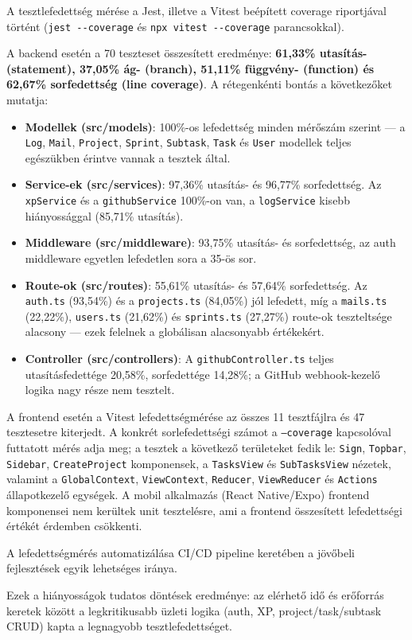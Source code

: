 A tesztlefedettség mérése a Jest, illetve a Vitest beépített coverage riportjával történt (\texttt{jest -{}-coverage} és \texttt{npx vitest -{}-coverage} parancsokkal).


A backend esetén a 70 teszteset összesített eredménye: \textbf{61,33\% utasítás- (statement), 37,05\% ág- (branch), 51,11\% függvény- (function) és 62,67\% sorfedettség (line coverage)}. A rétegenkénti bontás a következőket mutatja:

\begin{itemize}
  \item \textbf{Modellek (src/models)}: 100\%-os lefedettség minden mérőszám szerint — a \texttt{Log}, \texttt{Mail}, \texttt{Project}, \texttt{Sprint}, \texttt{Subtask}, \texttt{Task} és \texttt{User} modellek teljes egészükben érintve vannak a tesztek által.
  \item \textbf{Service-ek (src/services)}: 97,36\% utasítás- és 96,77\% sorfedettség. Az \texttt{xpService} és a \texttt{githubService} 100\%-on van, a \texttt{logService} kisebb hiányossággal (85,71\% utasítás).
  \item \textbf{Middleware (src/middleware)}: 93,75\% utasítás- és sorfedettség, az auth middleware egyetlen lefedetlen sora a 35-ös sor.
  \item \textbf{Route-ok (src/routes)}: 55,61\% utasítás- és 57,64\% sorfedettség. Az \texttt{auth.ts} (93,54\%) és a \texttt{projects.ts} (84,05\%) jól lefedett, míg a \texttt{mails.ts} (22,22\%), \texttt{users.ts} (21,62\%) és \texttt{sprints.ts} (27,27\%) route-ok teszteltsége alacsony — ezek felelnek a globálisan alacsonyabb értékekért.
  \item \textbf{Controller (src/controllers)}: A \texttt{githubController.ts} teljes utasításfedettége 20,58\%, sorfedettége 14,28\%; a GitHub webhook-kezelő logika nagy része nem tesztelt.
\end{itemize}


A frontend esetén a Vitest lefedettségmérése az összes 11 tesztfájlra és 47 tesztesetre kiterjedt. A konkrét sorlefedettségi számot a \texttt{--coverage} kapcsolóval futtatott mérés adja meg; a tesztek a következő területeket fedik le: \texttt{Sign}, \texttt{Topbar}, \texttt{Sidebar}, \texttt{CreateProject} komponensek, a \texttt{TasksView} és \texttt{SubTasksView} nézetek, valamint a \texttt{GlobalContext}, \texttt{ViewContext}, \texttt{Reducer}, \texttt{ViewReducer} és \texttt{Actions} állapotkezelő egységek. A mobil alkalmazás (React Native/Expo) frontend komponensei nem kerültek unit tesztelésre, ami a frontend összesített lefedettségi értékét érdemben csökkenti.

A lefedettségmérés automatizálása CI/CD pipeline keretében a jövőbeli fejlesztések egyik lehetséges iránya.

Ezek a hiányosságok tudatos döntések eredménye: az elérhető idő és erőforrás keretek között a legkritikusabb üzleti logika (auth, XP, project/task/subtask CRUD) kapta a legnagyobb tesztlefedettséget.